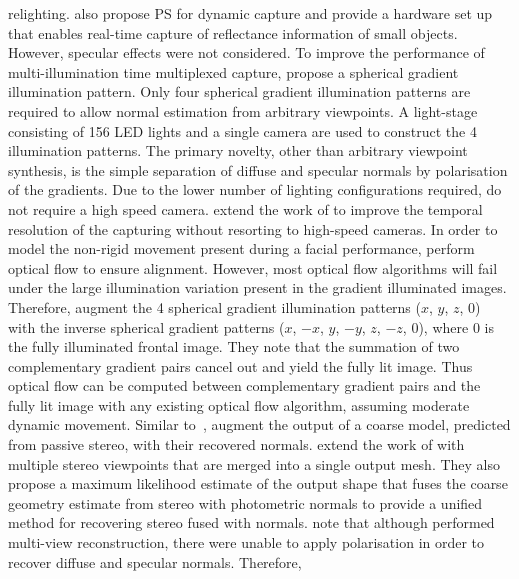 relighting.
\citet{malzbender2006surface} also propose PS for dynamic
capture and provide a hardware set up that enables real-time capture
of reflectance information of small objects. However, specular effects
were not considered.
To improve the performance of multi-illumination time multiplexed
capture, \citet{ma2007rapid} propose a spherical gradient illumination pattern.
Only four spherical gradient illumination patterns are required to allow
normal estimation from arbitrary viewpoints. A light-stage consisting of 156
LED lights and a single camera are used to construct the 4 illumination
patterns. The primary novelty, other than arbitrary viewpoint synthesis, is
the simple separation of diffuse and specular normals by polarisation of the
gradients. Due to the lower number of lighting configurations required,
\citet{ma2007rapid} do not require a high speed camera.
\citet{wilson2010temporal} extend the work of \citet{ma2007rapid} to
improve the temporal resolution of the capturing without resorting to
high-speed cameras. In order to model the non-rigid movement present
during a facial performance, \citet{wilson2010temporal} perform optical
flow to ensure alignment. However, most optical flow algorithms will fail under
the large illumination variation present in the gradient illuminated images.
Therefore, \citet{wilson2010temporal} augment the 4 spherical gradient
illumination patterns ($x$, $y$, $z$, $0$) with the inverse spherical
gradient patterns ($x$, $-x$, $y$, $-y$, $z$, $-z$, $0$), where $0$ is the
fully illuminated frontal image. They note that the summation of two
complementary gradient pairs cancel out and yield the fully lit image. Thus
optical flow can be computed between complementary gradient pairs and the fully
lit image with any existing optical flow algorithm, assuming moderate dynamic
movement. Similar to~\cite{ma2007rapid,debevec2000acquiring,weyrich2006analysis},
\citet{wilson2010temporal} augment the output of a coarse model, predicted
from passive stereo, with their recovered normals.
\citet{fyffe2011comprehensive} extend the work of \citet{wilson2010temporal}
with multiple stereo viewpoints that are merged into a single output mesh.
They also propose a maximum likelihood estimate of the output shape
that fuses the coarse geometry estimate from stereo with photometric normals
to provide a unified method for recovering stereo fused with normals.
\citet{ghosh2011multiview} note that although \citet{fyffe2011comprehensive}
performed multi-view reconstruction, there were unable to apply polarisation
in order to recover diffuse and specular normals. Therefore,
